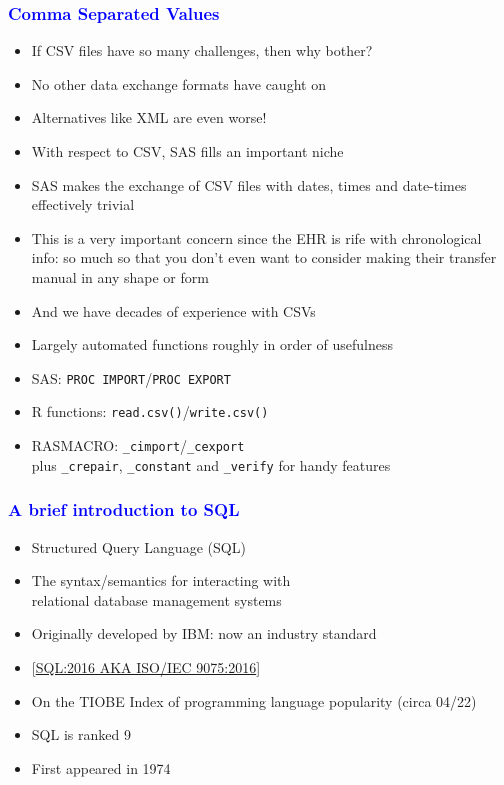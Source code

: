 \documentclass[11pt,pdftex,dvipsnames,usenames]{beamer}
\begin{document}
\begin{frame}[fragile]\frametitle{\bf\textcolor{blue}{Comma Separated Values}}

\begin{itemize}
\item If CSV files have so many challenges, then why bother?
\item No other data exchange formats have caught on
\item Alternatives like XML are even worse!
\item With respect to CSV, SAS fills an important niche
\item SAS makes the exchange of CSV files with dates, times
and date-times effectively trivial
\item This is a very important concern since the EHR is rife
with chronological info: so much so that you don't even want to
consider making their transfer manual in any shape or form
\item And we have decades of experience with CSVs
\item Largely automated functions roughly in order of usefulness
\item SAS: \texttt{PROC IMPORT}/\texttt{PROC EXPORT}
\item R functions: \texttt{read.csv()}/\texttt{write.csv()}
\item RASMACRO: \texttt{\_cimport}/\texttt{\_cexport}\\
plus \texttt{\_crepair}, \texttt{\_constant}
and \texttt{\_verify} for handy features
\end{itemize}

\end{frame}

\begin{frame}[fragile]\frametitle{\bf\textcolor{blue}{A brief introduction to SQL}}

\begin{itemize}
\item Structured Query Language (SQL) 
\item The syntax/semantics for interacting with\\
relational database management systems
\item Originally developed by IBM: now an industry standard
\item \textcolor{PineGreen}{[\href{https://www.iso.org/standard/63555.html}
{SQL:2016 AKA ISO/IEC 9075:2016}]}
\item On the TIOBE Index of programming language popularity (circa 04/22)
\item SQL is ranked 9
\item First appeared in 1974
\end{itemize}

\end{frame}
\end{document}

